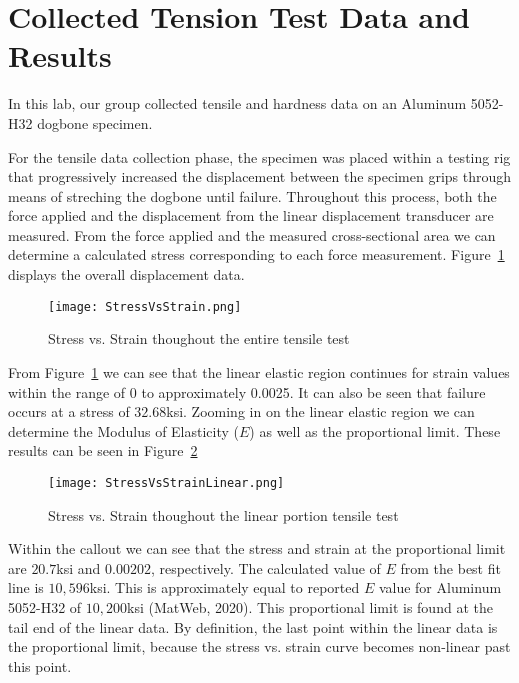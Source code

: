 \documentclass{article}
\newcommand{\YearPath}{../../../LatexConfig} %
\newcommand{\SemesterPath}{../../LatexConfig} %
\newcommand{\ClassPath}{../LatexConfig} %
\begin{document}




\section{Collected Tension Test Data and Results}
In this lab, our group collected tensile and hardness data on an Aluminum 5052-H32 dogbone specimen.

For the tensile data collection phase, the specimen was placed within a testing rig that progressively increased the displacement between the specimen grips through means of streching the dogbone until failure. Throughout this process, both the force applied and the displacement from the linear displacement transducer are measured. From the force applied and the measured cross-sectional area we can determine a calculated stress corresponding to each force measurement. Figure~\ref{fig:StressVsStrain} displays the overall displacement data.

\begin{figure}[H]
\begin{center}
\texttt{[image: StressVsStrain.png]}
\caption{Stress vs. Strain thoughout the entire tensile test}
\label{fig:StressVsStrain}
\end{center}
\end{figure}

From Figure~\ref{fig:StressVsStrain} we can see that the linear elastic region continues for strain values within the range of 0 to approximately 0.0025. It can also be seen that failure occurs at a stress of $32.68$ksi. Zooming in on the linear elastic region we can determine the Modulus of Elasticity ($E$) as well as the proportional limit. These results can be seen in Figure~\ref{fig:StressVsStrainLinear}

\begin{figure}[H]
\begin{center}
\texttt{[image: StressVsStrainLinear.png]}
\caption{Stress vs. Strain thoughout the linear portion tensile test}
\label{fig:StressVsStrainLinear}
\end{center}
\end{figure}

Within the callout we can see that the stress and strain at the proportional limit are $20.7$ksi and $0.00202$, respectively. The calculated value of $E$ from the best fit line is $10,596$ksi. This is approximately equal to reported $E$ value for Aluminum 5052-H32 of $10,200$ksi (MatWeb, 2020). This proportional limit is found at the tail end of the linear data. By definition, the last point within the linear data is the proportional limit, because the stress vs. strain curve becomes non-linear past this point.
\end{document}
